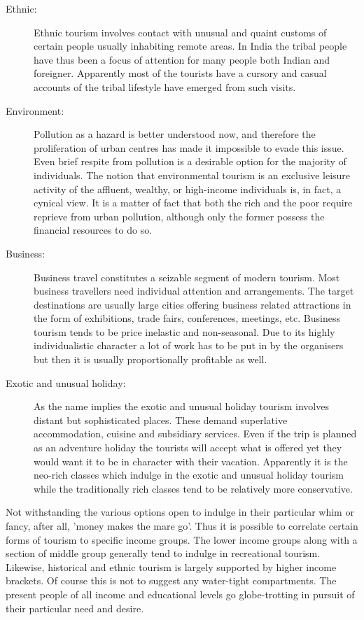 \begin{description}
  \item[Ethnic:] Ethnic tourism involves contact with unusual and quaint customs of certain people usually inhabiting remote areas. In India the tribal people have thus been a focus of attention for many people both Indian and foreigner. Apparently most of the tourists have a cursory and casual accounts of the tribal lifestyle have emerged from such visits.

  \item[Environment:] Pollution as a hazard is better understood now, and therefore the proliferation of urban centres has made it impossible to evade this issue. Even brief respite from pollution is a desirable option for the majority of individuals. The notion that environmental tourism is an exclusive leisure activity of the affluent, wealthy, or high-income individuals is, in fact, a cynical view. It is a matter of fact that both the rich and the poor require reprieve from urban pollution, although only the former possess the financial resources to do so. 

  \item[Business:] Business travel constitutes a seizable segment of modern tourism. Most business travellers need individual attention and arrangements. The target destinations are usually large cities offering business related attractions in the form of exhibitions, trade fairs, conferences, meetings, etc. Business tourism tends to be price inelastic and non-seasonal. Due to its highly individualistic character a lot of work has to be put in by the organisers but then it is usually proportionally profitable as well.

  \item[Exotic and unusual holiday:] As the name implies the exotic and unusual holiday tourism involves distant but sophisticated places. These demand superlative accommodation, cuisine and subsidiary services. Even if the trip is planned as an adventure holiday the tourists will accept what is offered yet they would want it to be in character with their vacation. Apparently it is the neo-rich classes which indulge in the exotic and unusual holiday tourism while the traditionally rich classes tend to be relatively more conservative.

\end{description}

\noindent Not withstanding the various options open to indulge in their particular whim or fancy, after all, 'money makes the mare go'. Thus it is possible to correlate certain forms of tourism to specific income groups. The lower income groups along with a section of middle group generally tend to indulge in recreational tourism. Likewise, historical and ethnic tourism is largely supported by higher income brackets. Of course this is not to suggest any water-tight compartments. The present people of all income and educational levels go globe-trotting in pursuit of their particular need and desire.

